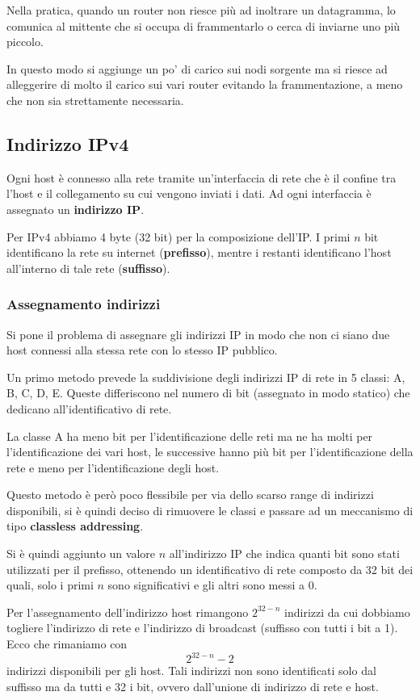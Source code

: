 Nella pratica, quando un router non riesce più ad inoltrare un
datagramma, lo comunica al mittente che si occupa di frammentarlo o
cerca di inviarne uno più piccolo.

In questo modo si aggiunge un po' di carico sui nodi sorgente ma si
riesce ad alleggerire di molto il carico sui vari router evitando
la frammentazione, a meno che non sia strettamente necessaria.

\subsection{Indirizzo IPv4}
Ogni host è connesso alla rete tramite un'interfaccia di rete che è il 
confine tra l'host e il collegamento su cui vengono inviati i dati. 
Ad ogni interfaccia è assegnato un \textbf{indirizzo IP}.

Per IPv4 abbiamo 4 byte (32 bit) per la composizione dell'IP. I primi 
$n$ bit identificano la rete su internet (\textbf{prefisso}), mentre 
i restanti identificano l'host all'interno di tale rete 
(\textbf{suffisso}).

\subsubsection{Assegnamento indirizzi}
Si pone il problema di assegnare gli indirizzi IP in modo che non ci
siano due host connessi alla stessa rete con lo stesso IP pubblico.

Un primo metodo prevede la suddivisione degli indirizzi IP di rete in 
5 classi: A, B, C, D, E. Queste differiscono nel numero di bit
(assegnato in modo statico) che dedicano all'identificativo di rete.

La classe A ha meno bit per l'identificazione delle reti ma ne ha
molti per l'identificazione dei vari host, le successive hanno più bit 
per l'identificazione della rete e meno per l'identificazione degli
host.

Questo metodo è però poco flessibile per via dello scarso range di 
indirizzi disponibili, si è quindi deciso di rimuovere le classi e
passare ad un meccanismo di tipo \textbf{classless addressing}.

Si è quindi aggiunto un valore $n$ all'indirizzo IP che indica quanti 
bit sono stati utilizzati per il prefisso, ottenendo un identificativo 
di rete composto da 32 bit dei quali, solo i primi $n$ sono 
significativi e gli altri sono messi a 0.

Per l'assegnamento dell'indirizzo host rimangono $2^{32-n}$ indirizzi 
da cui dobbiamo togliere l'indirizzo di rete e l'indirizzo di broadcast
(suffisso con tutti i bit a 1). Ecco che rimaniamo con
\[ 2^{32-n}-2 \]
indirizzi disponibili per gli host. Tali indirizzi non sono 
identificati solo dal suffisso ma da tutti e 32 i bit, ovvero 
dall'unione di indirizzo di rete e host.

